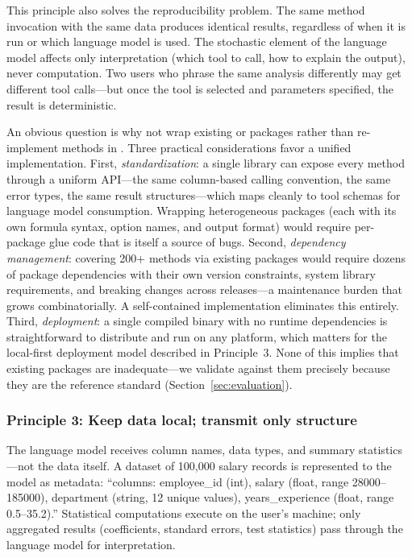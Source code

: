 This principle also solves the reproducibility problem. The same
method invocation with the same data produces identical results,
regardless of when it is run or which language model is used. The
stochastic element of the language model affects only interpretation
(which tool to call, how to explain the output), never computation.
Two users who phrase the same analysis differently may get different
tool calls---but once the tool is selected and parameters specified,
the result is deterministic.

An obvious question is why not wrap existing  or
 packages rather than re-implement methods in
. Three practical considerations favor a unified
implementation. First, \emph{standardization}: a single library can
expose every method through a uniform API---the same column-based
calling convention, the same error types, the same result
structures---which maps cleanly to tool schemas for language model
consumption. Wrapping heterogeneous packages (each with its own
formula syntax, option names, and output format) would require
per-package glue code that is itself a source of bugs. Second,
\emph{dependency management}: covering 200+ methods via existing
packages would require dozens of package dependencies with their own
version constraints, system library requirements, and breaking
changes across releases---a maintenance burden that grows
combinatorially. A self-contained implementation eliminates this
entirely. Third, \emph{deployment}: a single compiled binary with no
runtime dependencies is straightforward to distribute and run on any
platform, which matters for the local-first deployment model
described in Principle~3. None of this implies that existing packages
are inadequate---we validate against them precisely because they are
the reference standard (Section~\ref{sec:evaluation}).

\subsubsection{Principle 3: Keep data local; transmit only structure}

The language model receives column names, data types, and summary
statistics---not the data itself. A dataset of 100,000 salary records
is represented to the model as metadata: ``columns: employee\_id (int),
salary (float, range 28000--185000), department (string, 12 unique
values), years\_experience (float, range 0.5--35.2).'' Statistical
computations execute on the user's machine; only aggregated results
(coefficients, standard errors, test statistics) pass through the
language model for interpretation.

